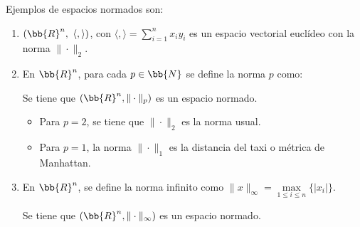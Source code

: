 \begin{ejemplo} Ejemplos de espacios normados son:
\begin{enumerate}
    \item $(\bb{R}^n,~\langle,\rangle)$, con $\langle,\rangle=\sum\limits_{i=1}^n x_iy_i$
    es un espacio vectorial euclídeo con la norma $\|\cdot \|_2.$

    \item En $\bb{R}^n$, para cada $p\in \bb{N}$ se define la norma $p$ como:

    Se tiene que $(\bb{R}^n, \|\cdot\|_p)$ es un espacio normado.
    \begin{itemize}
        \item Para $p=2$, se tiene que $\|\cdot\|_2$ es la norma usual.
        \item Para $p=1$, la norma $\|\cdot\|_1$ es la distancia del taxi o métrica de Manhattan.
    \end{itemize}

    \item En $\bb{R}^n$, se define la norma infinito como $\|x\|_\infty = \max\limits_{1\leq i\leq n}\{|x_i|\}$.

    Se tiene que $(\bb{R}^n, \|\cdot\|_\infty)$ es un espacio normado.
\end{enumerate}
\end{ejemplo}


